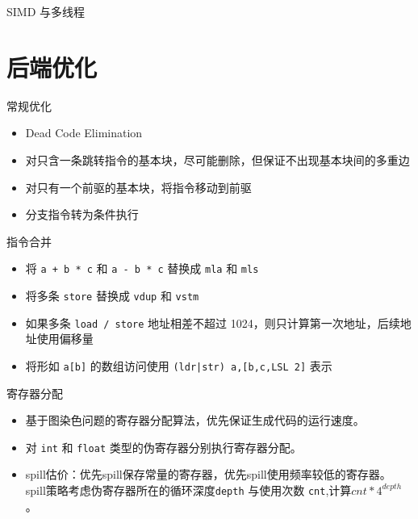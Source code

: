 \documentclass[aspectratio=169,UTF-8]{ctexbeamer}
\begin{document}
		\begin{frame}{SIMD 与多线程}
			
		\end{frame}
	
	\section{后端优化}
	
		\begin{frame}{常规优化}
			\begin{itemize}
				\item Dead Code Elimination
				\item 对只含一条跳转指令的基本块，尽可能删除，但保证不出现基本块间的多重边
				\item 对只有一个前驱的基本块，将指令移动到前驱
				\item 分支指令转为条件执行
			\end{itemize}
		\end{frame}
		
		\begin{frame}{指令合并}
		
			\begin{itemize}
				\item 将 \lstinline{a + b * c} 和 \lstinline{a - b * c} 替换成 \lstinline{mla} 和 \lstinline{mls}
				\item 将多条 \lstinline{store} 替换成 \lstinline{vdup} 和 \lstinline{vstm}
				\item 如果多条 \lstinline{load / store} 地址相差不超过 1024，则只计算第一次地址，后续地址使用偏移量
				\item 将形如 \lstinline{a[b]} 的数组访问使用 \lstinline{(ldr|str) a,[b,c,LSL 2]} 表示
			\end{itemize}
		\end{frame}
		
		\begin{frame}{寄存器分配}
			\begin{itemize}
				\item 基于图染色问题的寄存器分配算法，优先保证生成代码的运行速度。
				\item 对 \lstinline{int} 和 \lstinline{float} 类型的伪寄存器分别执行寄存器分配。
				\item spill估价：优先spill保存常量的寄存器，优先spill使用频率较低的寄存器。
				spill策略考虑伪寄存器所在的循环深度\lstinline{depth} 与使用次数 \lstinline{cnt},计算$cnt * 4^{depth}$。
				\end{itemize}
		\end{frame}
	
\end{document}
